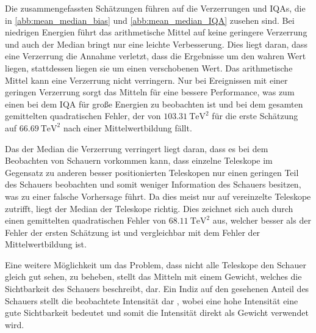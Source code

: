 Die zusammengefassten Schätzungen führen auf die Verzerrungen und IQAs, die in \autoref{abb:mean_median_bias} und \autoref{abb:mean_median_IQA} zusehen sind.
Bei niedrigen Energien führt das arithmetische Mittel auf keine geringere Verzerrung und auch der Median bringt nur eine leichte Verbesserung.
Dies liegt daran, dass eine Verzerrung die Annahme verletzt, dass die Ergebnisse um den wahren Wert liegen, stattdessen liegen sie um einen verschobenen
Wert.
Das arithmetische Mittel kann eine Verzerrung nicht verringern.
Nur bei Ereignissen mit einer geringen Verzerrung sorgt das Mitteln für eine bessere Performance, was zum einen bei dem IQA für große Energien zu beobachten
ist und bei dem gesamten gemittelten quadratischen Fehler, der von $\SI{103.31}{\tera\eV\squared}$ für die erste Schätzung auf $\SI{66.69}{\tera\eV\squared}$ nach einer
Mittelwertbildung fällt.

Das der Median die Verzerrung verringert liegt daran, dass es bei dem Beobachten von Schauern vorkommen kann, dass einzelne Teleskope im Gegensatz zu anderen
besser positionierten Teleskopen nur einen geringen Teil des Schauers beobachten und somit weniger Information des Schauers besitzen, was zu einer falsche Vorhersage
führt.
Da dies meist nur auf vereinzelte Teleskope zutrifft, liegt der Median der Teleskope richtig.
Dies zeichnet sich auch durch einen gemittelten quadratischen Fehler von $\SI{68.11}{\tera\eV\squared}$ aus, welcher besser als der Fehler der ersten Schätzung ist und
vergleichbar mit dem Fehler der Mittelwertbildung ist.

Eine weitere Möglichkeit um das Problem, dass nicht alle Teleskope den Schauer gleich gut sehen, zu beheben, stellt das Mitteln mit einem Gewicht, welches die
Sichtbarkeit des Schauers beschreibt, dar.
Ein Indiz auf den gesehenen Anteil des Schauers stellt die beobachtete Intensität dar , wobei eine hohe
Intensität eine gute Sichtbarkeit bedeutet und somit die Intensität direkt als Gewicht verwendet wird.

